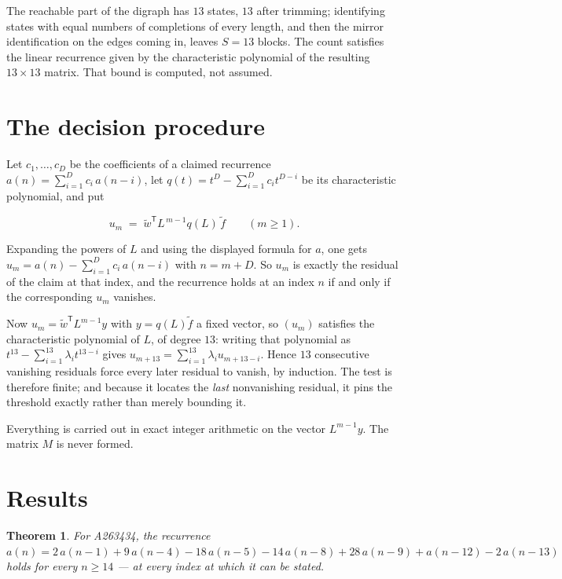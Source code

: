 \documentclass[11pt]{article}
\newtheorem{theorem}{Theorem}
\theoremstyle{definition}
\begin{document}
The reachable part of the digraph has $13$ states, $13$ after trimming; identifying states with equal numbers of completions of every length, and then the mirror identification on the edges coming in, leaves $S = 13$ blocks. The count satisfies the linear recurrence given by the characteristic polynomial of the resulting $13\times13$ matrix. That bound is computed, not assumed.

\section{The decision procedure}

Let $c_1,\dots,c_D$ be the coefficients of a claimed recurrence $a(n) = \sum_{i=1}^{D} c_i\,a(n-i)$, let $q(t) = t^{D} - \sum_{i=1}^{D} c_i t^{D-i}$ be its characteristic polynomial, and put

\[u_m \;=\; \tilde w^{\mathsf T} L^{\,m-1} q(L)\,\tilde f \qquad (m \ge 1).\]

Expanding the powers of $L$ and using the displayed formula for $a$, one gets $u_m = a(n) - \sum_{i=1}^{D} c_i\,a(n-i)$ with $n = m + D$. So $u_m$ is exactly the residual of the claim at that index, and the recurrence holds at an index $n$ if and only if the corresponding $u_m$ vanishes.

Now $u_m = \tilde w^{\mathsf T} L^{m-1} y$ with $y = q(L)\tilde f$ a fixed vector, so $(u_m)$ satisfies the characteristic polynomial of $L$, of degree $13$: writing that polynomial as $t^{13} - \sum_{i=1}^{13} \lambda_i t^{13-i}$ gives $u_{m+13} = \sum_{i=1}^{13} \lambda_i u_{m+13-i}$. Hence $13$ consecutive vanishing residuals force every later residual to vanish, by induction. The test is therefore finite; and because it locates the {\itshape last} nonvanishing residual, it pins the threshold exactly rather than merely bounding it.

Everything is carried out in exact integer arithmetic on the vector $L^{m-1}y$. The matrix $M$ is never formed.

\section{Results}

\begin{theorem} For A263434, the recurrence $a(n) = 2\,a(n-1) + 9\,a(n-4) - 18\,a(n-5) - 14\,a(n-8) + 28\,a(n-9) + a(n-12) - 2\,a(n-13)$ holds for every $n \ge 14$ --- at every index at which it can be stated.\end{theorem}
\end{document}
